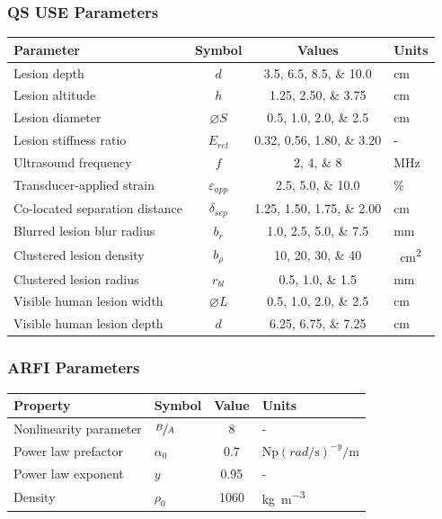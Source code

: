 \documentclass{beamer}
\newcommand{\percent}{\%}
\begin{document}
		\begin{frame}[label=qsParameters]
			\frametitle{QS USE Parameters}
			\centering
			\scriptsize
			\begin{tabular}{lccs[table-unit-alignment = left]}
				\toprule
				Parameter & Symbol & Values & Units \\
				\midrule
				Lesion depth & $d$ & \numlist{3.5;6.5;8.5;10.0} & \si{\cm} \\
				Lesion altitude & $h$ & \numlist{1.25;2.50;3.75} & \si{\cm} \\
				Lesion diameter & $\diameter S$ & \numlist{0.5;1.0;2.0;2.5} & \si{\cm} \\
				Lesion stiffness ratio & $E_{rel}$ & \numlist{0.32;0.56;1.80;3.20} & - \\
				Ultrasound frequency & $f$ & \numlist{2;4;8} & \si{\MHz} \\
				Transducer-applied strain & $\varepsilon_{app}$ & \numlist{2.5;5.0;10.0} & \si{\percent} \\
				Co-located separation distance & $\delta_{sep}$ & \numlist{1.25;1.50;1.75;2.00} & \si{\cm} \\
				Blurred lesion blur radius & $b_r$ & \numlist{1.0;2.5;5.0;7.5} & \si{\mm} \\
				Clustered lesion density & $b_\rho$ & \numlist{10;20;30;40} & \si{\per\cm\squared} \\
				Clustered lesion radius & $r_{bl}$ & \numlist{0.5;1.0;1.5} & \si{\mm} \\
				Visible human lesion width & $\diameter L$ & \numlist{0.5;1.0;2.0;2.5} & \si{\cm} \\
				Visible human lesion depth & $d$ & \numlist{6.25;6.75;7.25} & \si{\cm} \\
				\bottomrule
			\end{tabular}
		\end{frame}

		\begin{frame}[allowframebreaks,label=arfiParameters]
			\frametitle{ARFI Parameters}
			\centering
			\scriptsize
			\begin{tabular}{llSs[table-unit-alignment = left]}
				\toprule
				Property & Symbol & {Value} & Units \\
				\midrule
				Nonlinearity parameter & $\sfrac{B}{A}$ & 8 & - \\
				Power law prefactor & $\alpha_0$ & 0.7 & $\si{\neper} \left(\si{rad\per\s}\right)^{-y} \si{\per\m}$ \\
				Power law exponent & $y$ & 0.95 & - \\
				Density & $\rho_0$ & 1060 & \si{\kg\per\m\cubed} \\
				\bottomrule
			\end{tabular}
		\end{frame}
\end{document}
